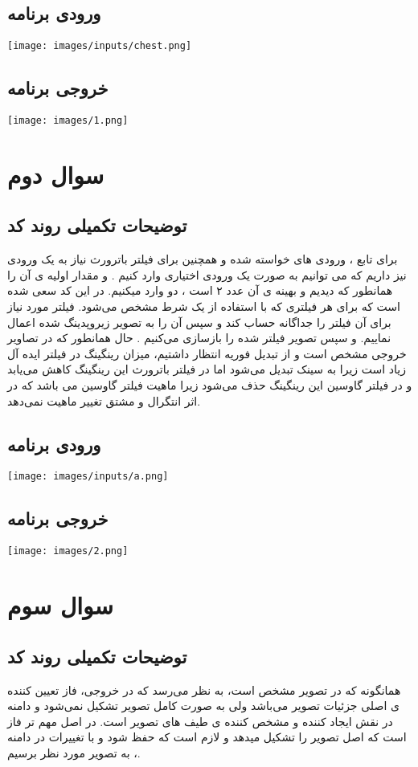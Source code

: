\documentclass[12pt]{article}
\begin{document}
	
		\subsection{ورودی برنامه}
		\texttt{[image: images/inputs/chest.png]}
		\subsection{خروجی برنامه}
		
		\texttt{[image: images/1.png]}
		\newpage
		
		\section{سوال دوم}
		\subsection{توضیحات تکمیلی روند کد}
		برای تابع ، ورودی های خواسته شده و همچنین برای فیلتر باترورث نیاز به یک ورودی 
		نیز داریم که می توانیم به صورت یک ورودی اختیاری وارد کنیم . و مقدار اولیه ی آن را همانطور که دیدیم و بهینه ی آن عدد ۲ است ، دو وارد میکنیم.
		در این کد سعی شده است که برای هر فیلتری  که با استفاده از یک شرط مشخص می‌شود. فیلتر مورد نیاز برای آن فیلتر را جداگانه حساب کند و سپس آن را به تصویر زیروپدینگ شده اعمال نماییم. و سپس تصویر فیلتر شده را بازسازی می‌کنیم .
	حال همانطور که در تصاویر خروجی مشخص است و از تبدیل فوریه انتظار داشتیم، میزان رینگینگ در فیلتر ایده آل زیاد است زیرا به سینک تبدیل می‌شود اما در فیلتر باترورث این رینگینگ کاهش می‌یابد و در فیلتر گاوسین این رینگینگ حذف می‌شود زیرا ماهیت فیلتر گاوسین 
	می باشد که در اثر انتگرال و مشتق تغییر ماهیت نمی‌دهد.
	
		\subsection{ورودی برنامه}
		\texttt{[image: images/inputs/a.png]}
		\subsection{خروجی برنامه}
		
		\texttt{[image: images/2.png]}
		\newpage
		
		\section{سوال سوم}
		\subsection{توضیحات تکمیلی روند کد}
			همانگونه که در تصویر مشخص است، به نظر می‌رسد که در خروجی، فاز تعیین کننده ی اصلی جزئیات تصویر می‌باشد ولی به صورت کامل تصویر تشکیل نمی‌شود و دامنه در نقش ایجاد کننده و مشخص کننده ی  طیف های تصویر است. 
			در اصل مهم تر فاز است که اصل تصویر را تشکیل میدهد و لازم است که حفظ شود و با تغییرات در دامنه ، به تصویر مورد نظر برسیم.
	
\end{document}
